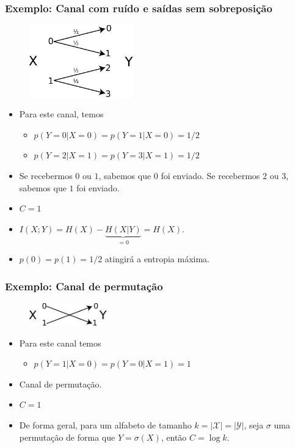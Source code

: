 \begin{frame}[allowframebreaks]
  \frametitle{Exemplo: Canal com ruído e saídas sem sobreposição}
                \begin{figure}[h!]
                \centering
                \includegraphics[width=0.4\textwidth]{images/nonc.pdf}
                \label{fig:nonc}
                \end{figure}

  \begin{itemize}
  \item Para este canal, temos
	\begin{itemize}
	\item $p(Y=0|X=0) = p(Y=1|X=0) = 1/2$
	\item $p(Y=2|X=1) = p(Y=3|X=1) = 1/2$
	\end{itemize}
  \item Se recebermos $0$ ou $1$, sabemos que $0$ foi enviado. 
	Se recebermos $2$ ou $3$, sabemos que $1$ foi enviado.
  \item $C=1$
  \item $I(X;Y) = H(X) - \underbrace{H(X|Y)}_{=0} = H(X)$.
  \item $p(0)=p(1)=1/2$ atingirá a entropia máxima.
  \end{itemize}
\end{frame}

\begin{frame}[allowframebreaks]
  \frametitle{Exemplo: Canal de permutação}
                \begin{figure}[h!]
                \centering
                \includegraphics[width=0.3\textwidth]{images/perchan.pdf}
                \label{fig:perchan}
                \end{figure}

  \begin{itemize}
  \item Para este canal temos
	\begin{itemize}
	\item $p(Y=1|X=0) = p(Y=0|X=1) =1$
	\end{itemize}
  \item Canal de permutação.
  \item $C=1$
  \item De forma geral, para um alfabeto de tamanho $k=\vert \mathcal{X} \vert = \vert \mathcal{Y} \vert$,
	seja $\sigma$ uma permutação de forma que $Y=\sigma(X)$, então $C=\log k$.
  \end{itemize}
\end{frame}


